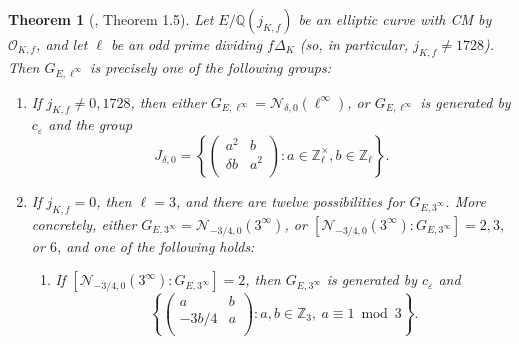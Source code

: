 \documentclass[11pt]{amsart}
\newtheorem{thm}[defn]{Theorem}
\theoremstyle{definition}
\newcommand{\Q}{\mathbb{Q}}
\newcommand{\Z}{\mathbb{Z}}
\newcommand{\Of}{\mathcal{O}_{K,f}}
\begin{document}
\begin{thm}[\cite{lozano-galoiscm}, Theorem 1.5]\label{thm-j0ell3alvaro}\label{thm-oddprimedividingdisc}
	Let $E/\Q(j_{K,f})$ be an elliptic curve with CM by $\Of$, and let $\ell$ be an odd prime dividing $f\Delta_K$ (so, in particular, $j_{K,f} \neq 1728$). Then $G_{E,\ell^\infty}$ is precisely one of the following groups:
	\begin{enumerate}
		\item[(a)] If $j_{K,f}\neq 0,1728$, then either $G_{E,\ell^\infty}=\mathcal{N}_{\delta,0}(\ell^\infty)$, or $G_{E,\ell^\infty}$ is generated by $c_{\varepsilon}$ and the group
		 \[ J_{\delta, 0} = \left\{ \left(\begin{array}{cc} a^2 & b\\ \delta b & a^2 \\ \end{array}\right): a \in \Z_\ell^\times, b \in \Z_\ell \right\}.\] 
		\item[(b)] If $j_{K,f}=0$, then $\ell=3$, and there are twelve possibilities for $G_{E,3^\infty}$. More concretely, either $G_{E,3^\infty}=\mathcal{N}_{-3/4,0}(3^\infty)$, or $[\mathcal{N}_{-3/4,0}(3^\infty):G_{E,3^\infty}]=2,3,$ or $6$, and one of the following holds:
		\begin{enumerate} \item[(i)] If $[\mathcal{N}_{-3/4,0}(3^\infty):G_{E,3^\infty}]=2$, then $G_{E,3^\infty}$ is generated by $c_{\varepsilon}$ and 
		\[ \left\{ \left(\begin{array}{cc}  a & b\\ -3b/4 & a\\ \end{array}\right): a,b\in  \Z_3,\ a\equiv 1 \bmod 3\right\}. \]
		

\end{enumerate}
\end{enumerate}
\end{thm}
\end{document}
